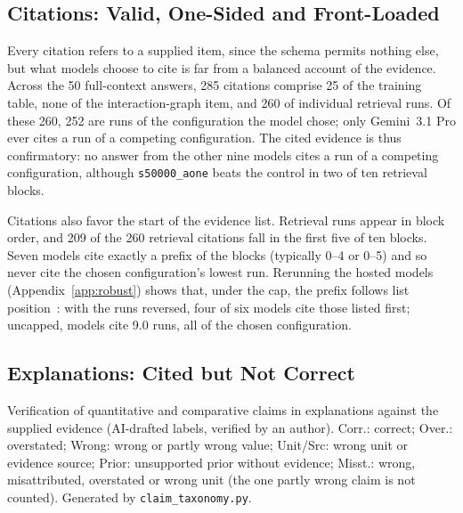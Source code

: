 \subsection{Citations: Valid, One-Sided and Front-Loaded}
\label{subsec:citations}
Every citation refers to a supplied item, since the schema permits nothing else, but what models choose to cite is far from a balanced account of the evidence. Across the 50 full-context answers, 285 citations comprise 25 of the training table, none of the interaction-graph item, and 260 of individual retrieval runs. Of these 260, 252 are runs of the configuration the model chose; only Gemini~3.1 Pro ever cites a run of a competing configuration. The cited evidence is thus confirmatory: no answer from the other nine models cites a run of a competing configuration, although \texttt{s50000\_aone} beats the control in two of ten retrieval blocks.

Citations also favor the start of the evidence list. Retrieval runs appear in block order, and 209 of the 260 retrieval citations fall in the first five of ten blocks. Seven models cite exactly a prefix of the blocks (typically 0--4 or 0--5) and so never cite the chosen configuration's lowest run. Rerunning the hosted models (Appendix~\ref{app:robust}) shows that, under the cap, the prefix follows list position~\cite{Liu2024LostMiddle}: with the runs reversed, four of six models cite those listed first; uncapped, models cite 9.0 runs, all of the chosen configuration.

\subsection{Explanations: Cited but Not Correct}
\label{subsec:claims}
\begin{table}[t]
\centering\footnotesize\setlength{\tabcolsep}{2.5pt}
\caption{Verification of quantitative and comparative claims in explanations against the supplied evidence (AI-drafted labels, verified by an author). Corr.: correct; Over.: overstated; Wrong: wrong or partly wrong value; Unit/Src: wrong unit or evidence source; Prior: unsupported prior without evidence; Misst.: wrong, misattributed, overstated or wrong unit (the one partly wrong claim is not counted). Generated by \texttt{claim\_taxonomy.py}.}
\label{tab:claims}
\begin{adjustbox}{max width=\columnwidth}

\end{adjustbox}
\end{table}

